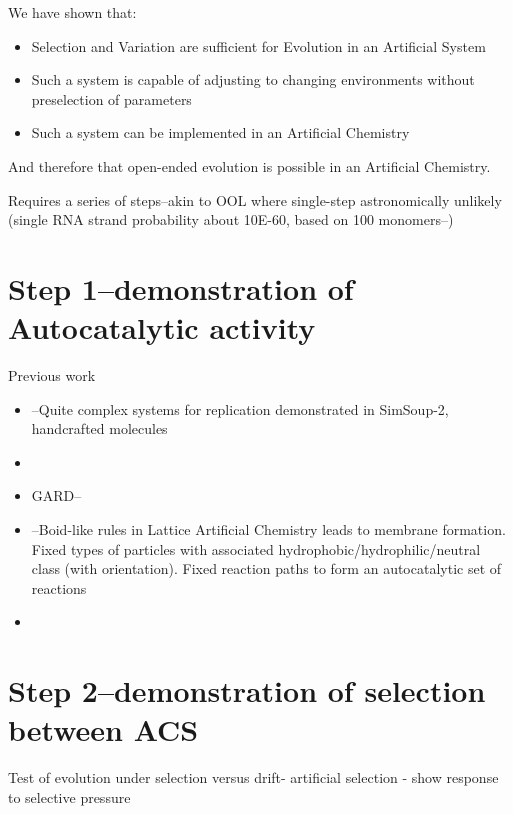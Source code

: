 We have shown that:
\begin{itemize}
	\item Selection and Variation are sufficient for Evolution in an Artificial System
	\item Such a system is capable of adjusting to changing environments without preselection of parameters
	\item Such a system can be implemented in an Artificial Chemistry
\end{itemize}

And therefore that open-ended evolution is possible in an Artificial Chemistry.


Requires a series of steps--akin to OOL where single-step
astronomically unlikely (single RNA strand probability about 10E-60,
based on 100 monomers--\autocite{Pascal2013})

\section{Step 1--demonstration of Autocatalytic activity}\label{step-1 -- demonstration-of-autocatalytic-activity}

Previous work

\begin{itemize}
	\item
 \autocite{Gordon-Smith2013}--Quite complex systems for replication demonstrated
 in SimSoup-2, handcrafted molecules
	\item
 \autocite{Bagley1990}
	\item
 GARD--\autocite{Segre1998}
	\item
 \autocite{Ono2002}--Boid-like rules in Lattice Artificial Chemistry leads to
 membrane formation. Fixed types of particles with associated
 hydrophobic/hydrophilic/neutral class (with orientation). Fixed
 reaction paths to form an autocatalytic set of reactions
	\item
 \autocite{Huning2000}
\end{itemize}

\section{Step 2--demonstration of selection between ACS}\label{step-2 -- demonstration-of-selection-between-acs}

Test of evolution under selection versus drift- artificial selection -
show response to selective pressure

